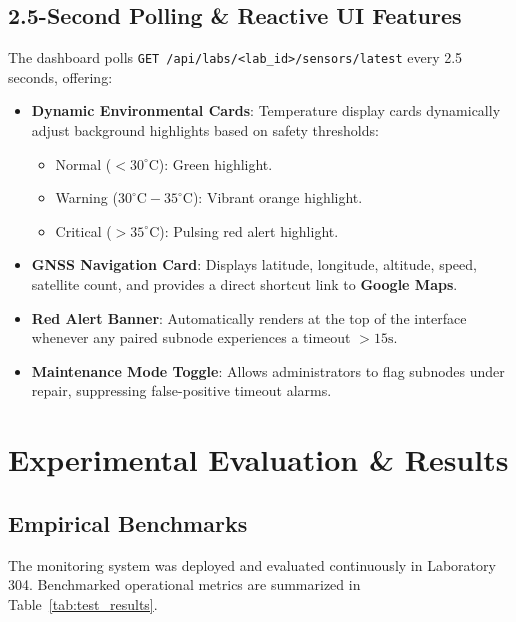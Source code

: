 \documentclass[11pt,a4paper]{article}
\begin{document}
\subsection{2.5-Second Polling \& Reactive UI Features}
The dashboard polls \texttt{GET /api/labs/<lab\_id>/sensors/latest} every 2.5 seconds, offering:
\begin{itemize}
    \item \textbf{Dynamic Environmental Cards}: Temperature display cards dynamically adjust background highlights based on safety thresholds:
    \begin{itemize}
        \item Normal ($<30^\circ\text{C}$): Green highlight.
        \item Warning ($30^\circ\text{C} - 35^\circ\text{C}$): Vibrant orange highlight.
        \item Critical ($>35^\circ\text{C}$): Pulsing red alert highlight.
    \end{itemize}
    \item \textbf{GNSS Navigation Card}: Displays latitude, longitude, altitude, speed, satellite count, and provides a direct shortcut link to \textbf{Google Maps}.
    \item \textbf{Red Alert Banner}: Automatically renders at the top of the interface whenever any paired subnode experiences a timeout $>15\text{s}$.
    \item \textbf{Maintenance Mode Toggle}: Allows administrators to flag subnodes under repair, suppressing false-positive timeout alarms.
\end{itemize}

\vspace{1em}

\section{Experimental Evaluation \& Results}

\subsection{Empirical Benchmarks}
The monitoring system was deployed and evaluated continuously in Laboratory 304. Benchmarked operational metrics are summarized in Table~\ref{tab:test_results}.
\end{document}
